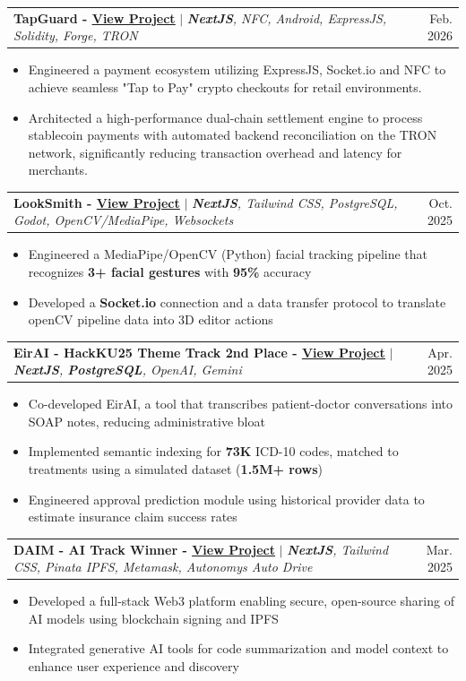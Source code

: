 \documentclass[letterpaper,10.5pt]{article}
\makeatletter
\newcommand{\resumeItem}[1]{
  \item\small{
    {#1 \vspace{-2pt}}
  }
}
\newcommand{\resumeProjectHeading}[2]{
    \item
    \begin{tabular*}{0.97\textwidth}{l@{\extracolsep{\fill}}r}
      \small#1 & #2 \\
    \end{tabular*}\vspace{-7pt}
}
\newcommand{\resumeItemListStart}{\begin{itemize}}
\newcommand{\resumeItemListEnd}{\end{itemize}\vspace{-5pt}}
\makeatother
\begin{document}
    \resumeProjectHeading
          {\textbf{TapGuard - \href{https://github.com/bhumikaguptaa/PennHack26}{\underline{View Project}}} $|$ \emph{\textbf{NextJS}, NFC, Android, ExpressJS, Solidity, Forge, TRON}}{Feb. 2026}
          \resumeItemListStart
           \resumeItem{Engineered a payment ecosystem utilizing ExpressJS, Socket.io and NFC to achieve seamless "Tap to Pay" crypto checkouts for retail environments.}
           \resumeItem{Architected a high-performance dual-chain settlement engine to process stablecoin payments with automated backend reconciliation on the TRON network, significantly reducing transaction overhead and latency for merchants.}
          \resumeItemListEnd
    \resumeProjectHeading
          {\textbf{LookSmith - \href{https://github.com/Vegito2367/LookSmith}{\underline{View Project}}} $|$ \emph{\textbf{NextJS}, Tailwind CSS, PostgreSQL, Godot, OpenCV/MediaPipe, Websockets}}{Oct. 2025}
          \resumeItemListStart
            \resumeItem{Engineered a MediaPipe/OpenCV (Python) facial tracking pipeline that recognizes \textbf{3+ facial gestures} with \textbf{95\%} accuracy}
            \resumeItem{Developed a \textbf{Socket.io} connection and a data transfer protocol to translate openCV pipeline data into 3D editor actions}
          \resumeItemListEnd
    \resumeProjectHeading
          {\textbf{EirAI - HackKU25 Theme Track 2nd Place - \href{https://github.com/Vegito2367/DAIM}{\underline{View Project}}} $|$ \emph{\textbf{NextJS}, \textbf{PostgreSQL}, OpenAI, Gemini}}{Apr. 2025}
          \resumeItemListStart
            \resumeItem{Co-developed EirAI, a tool that transcribes patient-doctor conversations into SOAP notes, reducing administrative bloat}
            \resumeItem{Implemented semantic indexing for \textbf{73K} ICD-10 codes, matched to treatments using a simulated dataset (\textbf{1.5M+ rows})}
            \resumeItem{Engineered approval prediction module using historical provider data to estimate insurance claim success rates}
          \resumeItemListEnd
    \resumeProjectHeading
          {\textbf{DAIM - AI Track Winner - \href{https://github.com/Vegito2367/DAIM}{\underline{View Project}}} $|$ \emph{\textbf{NextJS}, Tailwind CSS, Pinata IPFS, Metamask, Autonomys Auto Drive}}{Mar. 2025}
          \resumeItemListStart
            \resumeItem{Developed a full-stack Web3 platform enabling secure, open-source sharing of AI models using blockchain signing and IPFS}
            \resumeItem{Integrated generative AI tools for code summarization and model context to enhance user experience and discovery}
          \resumeItemListEnd
\end{document}

